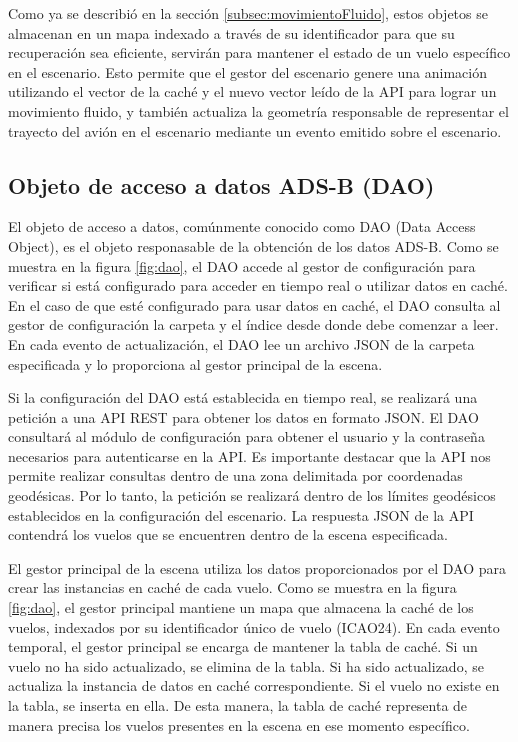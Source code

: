 \documentclass[a4paper, 11pt]{book}
\begin{document}
Como ya se describió en la sección \ref{subsec:movimientoFluido}, estos objetos se almacenan en un mapa indexado a través de su identificador para que su recuperación sea eficiente, servirán para mantener el estado de un vuelo específico en el escenario. Esto permite que el gestor del escenario genere una animación utilizando el vector de la caché y el nuevo vector leído de la API para lograr un movimiento fluido, y también actualiza la geometría responsable de representar el trayecto del avión en el escenario mediante un evento emitido sobre el escenario.

\subsection{Objeto de acceso a datos ADS-B (DAO)}
\label{subsec:dao}
El objeto de acceso a datos, comúnmente conocido como DAO (Data Access Object), es el objeto responasable de la obtención de los datos ADS-B. Como se muestra en la figura \ref{fig:dao}, el DAO accede al gestor de configuración para verificar si está configurado para acceder en tiempo real o utilizar datos en caché. En el caso de que esté configurado para usar datos en caché, el DAO consulta al gestor de configuración la carpeta y el índice desde donde debe comenzar a leer. En cada evento de actualización, el DAO lee un archivo JSON de la carpeta especificada y lo proporciona al gestor principal de la escena.

Si la configuración del DAO está establecida en tiempo real, se realizará una petición a una API REST para obtener los datos en formato JSON. El DAO consultará al módulo de configuración para obtener el usuario y la contraseña necesarios para autenticarse en la API. Es importante destacar que la API nos permite realizar consultas dentro de una zona delimitada por coordenadas geodésicas. Por lo tanto, la petición se realizará dentro de los límites geodésicos establecidos en la configuración del escenario. La respuesta JSON de la API contendrá los vuelos que se encuentren dentro de la escena especificada.

El gestor principal de la escena utiliza los datos proporcionados por el DAO para crear las instancias en caché de cada vuelo. Como se muestra en la figura \ref{fig:dao}, el gestor principal mantiene un mapa que almacena la caché de los vuelos, indexados por su identificador único de vuelo (ICAO24). En cada evento temporal, el gestor principal se encarga de mantener la tabla de caché. Si un vuelo no ha sido actualizado, se elimina de la tabla. Si ha sido actualizado, se actualiza la instancia de datos en caché correspondiente. Si el vuelo no existe en la tabla, se inserta en ella. De esta manera, la tabla de caché representa de manera precisa los vuelos presentes en la escena en ese momento específico.
\end{document}
